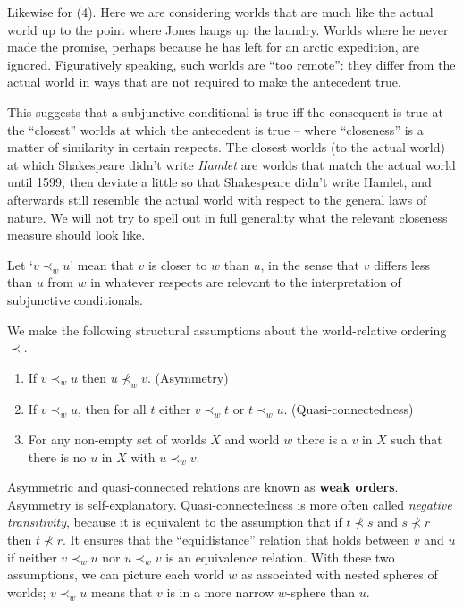 Likewise for (4). Here we are considering worlds that are much like the actual
world up to the point where Jones hangs up the laundry. Worlds where he never
made the promise, perhaps because he has left for an arctic expedition, are
ignored. Figuratively speaking, such worlds are ``too remote'': they differ from
the actual world in ways that are not required to make the antecedent true.

This suggests that a subjunctive conditional is true iff the consequent is true
at the ``closest'' worlds at which the antecedent is true -- where ``closeness''
is a matter of similarity in certain respects. The closest worlds (to the actual
world) at which Shakespeare didn't write \emph{Hamlet} are worlds that match the
actual world until 1599, then deviate a little so that Shakespeare didn't write
Hamlet, and afterwards still resemble the actual world with respect to the
general laws of nature. We will not try to spell out in full generality what the
relevant closeness measure should look like.

Let `$v \prec_w u$' mean that $v$ is closer to $w$ than $u$, in the sense that
$v$ differs less than $u$ from $w$ in whatever respects are relevant to the
interpretation of subjunctive conditionals.

We make the following structural assumptions about the world-relative ordering
$\prec$.

\begin{enumerate}[leftmargin=8mm]
  \itemsep-1mm
  \item If $v \prec_w u$ then $u \nprec_w v$. (Asymmetry)
  \item If $v \prec_w u$, then for all $t$ either $v \prec_w t$ or
        $t \prec_w u$. (Quasi-connectedness)
  \item For any non-empty set of worlds $X$ and world $w$ there is a $v$ in $X$
        such that there is no $u$ in $X$ with $u \prec_w v$.
\end{enumerate}

Asymmetric and quasi-connected relations are known as \textbf{weak orders}.
Asymmetry is self-explanatory. Quasi-connectedness is more often called
\emph{negative transitivity}, because it is equivalent to the assumption that if
$t \nprec s$ and $s\nprec r$ then $t\nprec r$. It ensures that the ``equidistance''
relation that holds between $v$ and $u$ if neither $v \prec_w u$ nor
$u \prec_w v$ is an equivalence relation. With these two assumptions, we can
picture each world $w$ as associated with nested spheres of worlds;
$v \prec_w u$ means that $v$ is in a more narrow $w$-sphere than $u$.

